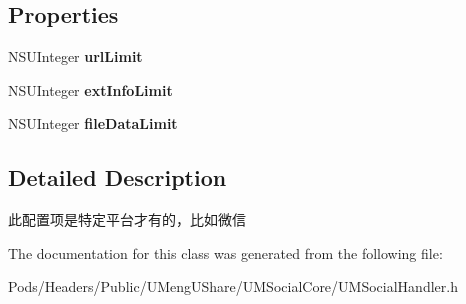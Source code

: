 \subsection*{Properties}
\begin{DoxyCompactItemize}
\item 
\mbox{\label{interface_u_m_social_share_extend_object_config_a57232466d890582a2f87a939e9edef4d}} 
N\+S\+U\+Integer {\bfseries url\+Limit}
\item 
\mbox{\label{interface_u_m_social_share_extend_object_config_adc29f148c4c9410771d26bde23c3757a}} 
N\+S\+U\+Integer {\bfseries ext\+Info\+Limit}
\item 
\mbox{\label{interface_u_m_social_share_extend_object_config_a656bae23aac163b767617a9afd1cf4a4}} 
N\+S\+U\+Integer {\bfseries file\+Data\+Limit}
\end{DoxyCompactItemize}


\subsection{Detailed Description}
此配置项是特定平台才有的，比如微信 

The documentation for this class was generated from the following file\+:\begin{DoxyCompactItemize}
\item 
Pods/\+Headers/\+Public/\+U\+Meng\+U\+Share/\+U\+M\+Social\+Core/U\+M\+Social\+Handler.\+h\end{DoxyCompactItemize}
